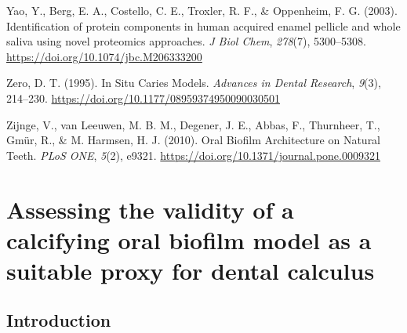 \documentclass[
  letterpaper,
]{book}
\newlength{\cslhangindent}
\newlength{\cslentryspacingunit} %
\newenvironment{CSLReferences}[2] %
 {%
  \setlength{\parindent}{0pt}
  \ifodd #1
  \let\oldpar\par
  \def\par{\hangindent=\cslhangindent\oldpar}
  \fi
  \setlength{\parskip}{#2\cslentryspacingunit}
 }%
 {}
\begin{document}
\begin{CSLReferences}{1}{0}
\leavevmode{}%
Yao, Y., Berg, E. A., Costello, C. E., Troxler, R. F., \& Oppenheim, F.
G. (2003). Identification of protein components in human acquired enamel
pellicle and whole saliva using novel proteomics approaches. \emph{J
Biol Chem}, \emph{278}(7), 5300--5308.
\url{https://doi.org/10.1074/jbc.M206333200}

\leavevmode{}%
Zero, D. T. (1995). In {Situ Caries Models}. \emph{Advances in Dental
Research}, \emph{9}(3), 214--230.
\url{https://doi.org/10.1177/08959374950090030501}

\leavevmode{}%
Zijnge, V., van Leeuwen, M. B. M., Degener, J. E., Abbas, F., Thurnheer,
T., Gmür, R., \& M. Harmsen, H. J. (2010). Oral {Biofilm Architecture}
on {Natural Teeth}. \emph{PLoS ONE}, \emph{5}(2), e9321.
\url{https://doi.org/10.1371/journal.pone.0009321}

\end{CSLReferences}


\hypertarget{byoc-valid}{%
\chapter{Assessing the validity of a calcifying oral biofilm model as a
suitable proxy for dental calculus}\label{byoc-valid}}

\hypertarget{introduction}{%
\section{Introduction}\label{introduction}}
\end{document}
